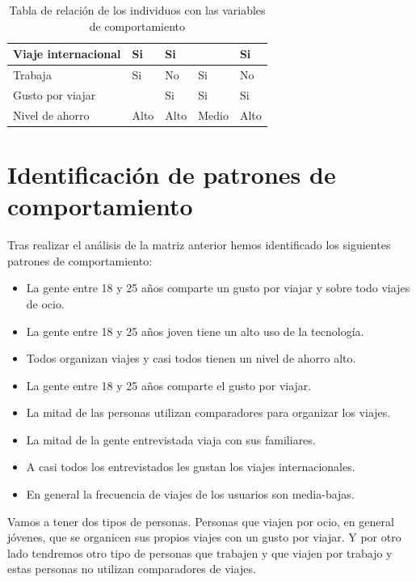 \begin{table}[H]
\begin{tabular}{|p{10em}||p{7em}|p{7em}|p{7em}|p{8em}|}
        Viaje internacional               & Si          & Si                             &                    & Si                              \\ \hline
        Trabaja                           & Si          & No                             & Si                 & No                              \\ \hline
        Gusto por viajar                  &             & Si                             & Si                 & Si                              \\ \hline
        Nivel de ahorro                   & Alto        & Alto                           & Medio              & Alto                            \\ \hline
    \end{tabular}
    \caption{Tabla de relación de los individuos con las variables de comportamiento}
    \label{table:relacion-individuos-variables}
\end{table}

\section{Identificación de patrones de comportamiento}
Tras realizar el análisis de la matriz anterior hemos identificado los siguientes patrones de comportamiento:
\begin{itemize}
    \item La gente entre 18 y 25 años comparte un gusto por viajar y sobre todo viajes de ocio.
    \item La gente entre 18 y 25 años joven tiene un alto uso de la tecnología.
    \item Todos organizan viajes y casi todos tienen un nivel de ahorro alto. 
    \item La gente entre 18 y 25 años comparte el gusto por viajar.
    \item La mitad de las personas utilizan comparadores para organizar los viajes.
    \item La mitad de la gente entrevistada viaja con sus familiares.
    \item A casi todos los entrevistados les gustan los viajes internacionales.
    \item En general la frecuencia de viajes de los usuarios son media-bajas.
\end{itemize}

Vamos a tener dos tipos de personas. Personas que viajen por ocio, en general jóvenes, que se organicen sus propios viajes con un gusto por viajar. Y por otro lado tendremos otro tipo de personas que trabajen y que viajen por trabajo y estas personas no utilizan comparadores de viajes.

